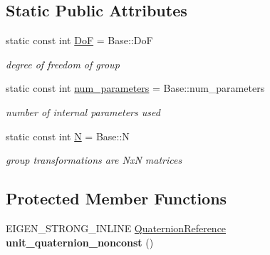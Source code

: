 \subsection*{Static Public Attributes}
\begin{DoxyCompactItemize}
\item 
static const int \hyperlink{class_sophus_1_1_s_o3_group_a8a74ea9c68a0ffeca78fac87b1938a87}{DoF} = Base\+::\+DoF\hypertarget{class_sophus_1_1_s_o3_group_a8a74ea9c68a0ffeca78fac87b1938a87}{}\label{class_sophus_1_1_s_o3_group_a8a74ea9c68a0ffeca78fac87b1938a87}

\begin{DoxyCompactList}\small\item\em degree of freedom of group \end{DoxyCompactList}\item 
static const int \hyperlink{class_sophus_1_1_s_o3_group_a6406674167b756a348ac5bc61f58dc5d}{num\+\_\+parameters} = Base\+::num\+\_\+parameters\hypertarget{class_sophus_1_1_s_o3_group_a6406674167b756a348ac5bc61f58dc5d}{}\label{class_sophus_1_1_s_o3_group_a6406674167b756a348ac5bc61f58dc5d}

\begin{DoxyCompactList}\small\item\em number of internal parameters used \end{DoxyCompactList}\item 
static const int \hyperlink{class_sophus_1_1_s_o3_group_a8807fcc497570011e3b0bb419f17b84e}{N} = Base\+::N\hypertarget{class_sophus_1_1_s_o3_group_a8807fcc497570011e3b0bb419f17b84e}{}\label{class_sophus_1_1_s_o3_group_a8807fcc497570011e3b0bb419f17b84e}

\begin{DoxyCompactList}\small\item\em group transformations are NxN matrices \end{DoxyCompactList}\end{DoxyCompactItemize}
\subsection*{Protected Member Functions}
\begin{DoxyCompactItemize}
\item 
E\+I\+G\+E\+N\+\_\+\+S\+T\+R\+O\+N\+G\+\_\+\+I\+N\+L\+I\+NE \hyperlink{class_sophus_1_1_s_o3_group_aaa65d0f058d31e972da558d6d909a2da}{Quaternion\+Reference} {\bfseries unit\+\_\+quaternion\+\_\+nonconst} ()\hypertarget{class_sophus_1_1_s_o3_group_aacb9eb33c9157d0c77dfea2d35112b91}{}\label{class_sophus_1_1_s_o3_group_aacb9eb33c9157d0c77dfea2d35112b91}

\end{DoxyCompactItemize}
